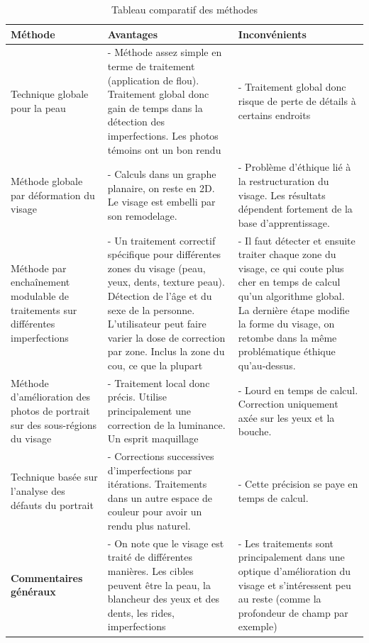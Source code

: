 \documentclass[11pt, french]{report-rd-info}
\begin{document}
\begin{table}
\begin{center}
\begin{tabular}{|p{3cm}|p{6.5cm}|p{6.5cm}|}
\hline
\textbf{Méthode} & \textbf{Avantages} & \textbf{Inconvénients} \\ \hline
Technique globale pour la peau & - Méthode assez simple en terme de traitement (application de flou). Traitement global donc gain de temps dans la détection des imperfections. Les photos témoins ont un bon rendu & - Traitement global donc risque de perte de détails à certains endroits \\ \hline
Méthode globale par déformation du visage & - Calculs dans un graphe planaire, on reste en 2D. Le visage est embelli par son remodelage. & - Problème d'éthique lié à la restructuration du visage. Les résultats dépendent fortement de la base d'apprentissage. \\ \hline
Méthode par enchaînement modulable de traitements sur différentes imperfections & - Un traitement correctif spécifique pour différentes zones du visage (peau, yeux, dents, texture peau). Détection de l'âge et du sexe de la personne. L'utilisateur peut faire varier la dose de correction par zone. Inclus la zone du cou, ce que la plupart  & - Il faut détecter et ensuite traiter chaque zone du visage, ce qui coute plus cher en temps de calcul qu'un algorithme global. La dernière étape modifie la forme du visage, on retombe dans la même problématique éthique qu'au-dessus. \\ \hline
Méthode d’amélioration des photos de portrait sur des sous-régions du visage & - Traitement local donc précis. Utilise principalement une correction de la luminance. Un esprit maquillage & - Lourd en temps de calcul. Correction uniquement axée sur les yeux et la bouche. \\ \hline
Technique basée sur l’analyse des défauts du portrait & - Corrections successives d'imperfections par itérations. Traitements dans un autre espace de couleur pour avoir un rendu plus naturel. & - Cette précision se paye en temps de calcul. \\ \hline
\textbf{Commentaires généraux} & - On note que le visage est traité de différentes manières. Les cibles peuvent être la peau, la blancheur des yeux et des dents, les rides, imperfections & - Les traitements sont principalement dans une optique d'amélioration du visage et s'intéressent peu au reste (comme la profondeur de champ par exemple) \\ \hline
\end{tabular}
\end{center}
\caption{Tableau comparatif des méthodes}
\label{tab:ComparaisonMéthodes}
\end{table}
\end{document}
